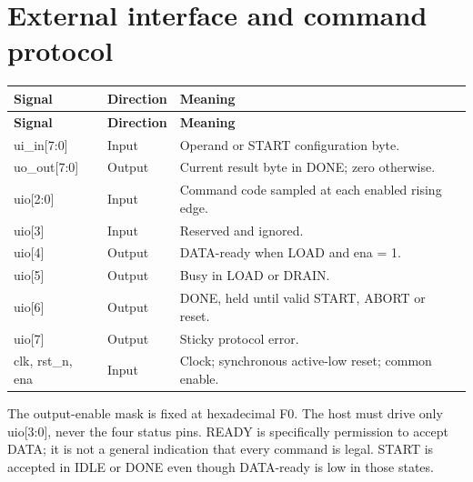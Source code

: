 \documentclass[10pt,letterpaper]{article}
\begin{document}
\section{External interface and command protocol}
{\small\begin{longtable}{>{\raggedright\arraybackslash}p{0.213235\dimexpr\linewidth-6\tabcolsep\relax}>{\raggedright\arraybackslash}p{0.117647\dimexpr\linewidth-6\tabcolsep\relax}>{\raggedright\arraybackslash}p{0.669118\dimexpr\linewidth-6\tabcolsep\relax}}\toprule
\textbf{Signal} & \textbf{Direction} & \textbf{Meaning}\\\midrule\endfirsthead\textbf{Signal} & \textbf{Direction} & \textbf{Meaning}\\\midrule\endhead
ui\_in[7:0] & Input & Operand or START configuration byte.\\
uo\_out[7:0] & Output & Current result byte in DONE; zero otherwise.\\
uio[2:0] & Input & Command code sampled at each enabled rising edge.\\
uio[3] & Input & Reserved and ignored.\\
uio[4] & Output & DATA-ready when LOAD and ena = 1.\\
uio[5] & Output & Busy in LOAD or DRAIN.\\
uio[6] & Output & DONE, held until valid START, ABORT or reset.\\
uio[7] & Output & Sticky protocol error.\\
clk, rst\_n, ena & Input & Clock; synchronous active-low reset; common enable.\\
\bottomrule\end{longtable}}
The output-enable mask is fixed at hexadecimal F0. The host must drive only uio[3:0], never the four status pins. READY is specifically permission to accept DATA; it is not a general indication that every command is legal. START is accepted in IDLE or DONE even though DATA-ready is low in those states.
\end{document}
